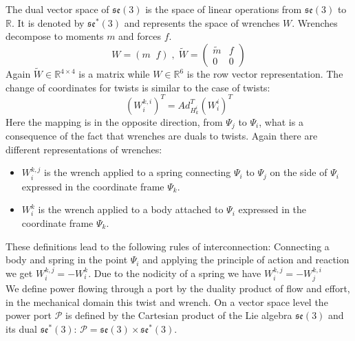 \documentclass[a4paper,twoside, openright,12pt]{report}
\begin{document}
The  dual vector space of $\mathfrak{se}(3)$ is the space of linear operations from $\mathfrak{se}(3)$ to $\mathbb{R} $. It is denoted by $\mathfrak{se}^*(3)$ and represents the space of wrenches $W$. Wrenches decompose to moments $ m $ and forces $ f $.
\begin{equation}
 W = ( m \;\; f) \; , \; \tilde{W} = \begin{pmatrix}
\tilde{m} & f \\ 0 & 0\end{pmatrix} \end{equation}
Again $\tilde{W} \in \mathbb{R}^{4\times 4}$ is a matrix while $W \in \mathbb{R}^6$ is the  row vector representation.
The change of coordinates for twists is similar to the case of twists:
\begin{equation}
(W_i^{k,i})^T = Ad_{H_k^i}^T (W_i^i)^T \end{equation} 
Here the mapping is in the opposite direction, from $\Psi_j$ to $\Psi_i$, what is a consequence of the fact that wrenches are duals to twists. Again there are different representations of wrenches: \begin{itemize}
\item $W_i^{k,j}$ is the wrench applied to a spring connecting $\Psi_i$ to $\Psi_j$ on the side of $\Psi_i$ expressed in the coordinate frame $\Psi_k$.
\item $W_i^k $ is the wrench applied to a body attached to $\Psi_i$ expressed in the coordinate frame $\Psi_k$.
\end{itemize}
These definitions lead to the following rules of interconnection:
Connecting a body and spring in the point $\Psi_i$ and applying the principle of action and reaction we get $W_i^{k,j} = -W_i^k$. Due to the nodicity of a spring we have $ W_i^{k,j} = -W_j^{k,i} $\\

We define power flowing through a port by the duality product of flow and effort, in the mechanical domain this twist and wrench. On a vector space level the power port $\mathcal{P}$ is defined by the Cartesian product of the Lie algebra $\mathfrak{se}(3)$ and its dual $\mathfrak{se}^*(3)$: $\mathcal{P} = \mathfrak{se}(3) \times \mathfrak{se}^*(3)$.
\end{document}
